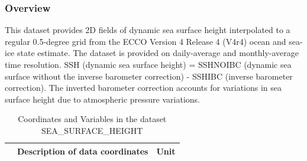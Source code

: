 \subsubsection{Overview}
This dataset provides 2D fields of dynamic sea surface height interpolated to a regular 0.5-degree grid from the ECCO Version 4 Release 4 (V4r4) ocean and sea-ice state estimate. The dataset is provided on daily-average and monthly-average time resolution. SSH (dynamic sea surface height) = SSHNOIBC (dynamic sea surface without the inverse barometer correction) - SSHIBC (inverse barometer correction). The inverted barometer correction accounts for variations in sea surface height due to atmospheric pressure variations. 
\begin{longtable}{|m{}|m{}|m{}|}
\caption{Coordinates and Variables in the dataset SEA\_SURFACE\_HEIGHT}
\label{tab:table-<xarray.Dataset> Size: 3MB
Dimensions:         (time: 1, latitude: 360, longitude: 720, nv: 2)
Coordinates:
  * time            (time) datetime64[ns] 8B 2017-12-29T12:00:00
  * latitude        (latitude) float32 1kB -89.75 -89.25 -88.75 ... 89.25 89.75
  * longitude       (longitude) float32 3kB -179.8 -179.2 -178.8 ... 179.2 179.8
    time_bnds       (time, nv) datetime64[ns] 16B ...
    latitude_bnds   (latitude, nv) float32 3kB ...
    longitude_bnds  (longitude, nv) float32 6kB ...
Dimensions without coordinates: nv
Data variables:
    SSH             (time, latitude, longitude) float32 1MB ...
    SSHIBC          (time, latitude, longitude) float32 1MB ...
    SSHNOIBC        (time, latitude, longitude) float32 1MB ...
Attributes: (12/57)
    acknowledgement:              This research was carried out by the Jet Pr...
    author:                       Ian Fenty and Ou Wang
    cdm_data_type:                Grid
    comment:                      Fields provided on a regular lat-lon grid. ...
    Conventions:                  CF-1.8, ACDD-1.3
    coordinates_comment:          Note: the global 'coordinates' attribute de...
    ...                           ...
    time_coverage_duration:       P1D
    time_coverage_end:            2017-12-30T00:00:00
    time_coverage_resolution:     P1D
    time_coverage_start:          2017-12-29T00:00:00
    title:                        ECCO Sea Surface Height - Daily Mean 0.5 De...
    uuid:                         7beb77e0-404a-11eb-8bf7-0cc47a3f891b-fields} \\ 
\hline \endhead \hline \endfoot
\rowcolor{lightgray} \multicolumn{1}{|c|}{\textbf{Coordinates}} & \multicolumn{1}{|c|}{\textbf{Description of data coordinates}} &  \multicolumn{1}{|c|}{\textbf{Unit}}\\ \hline

\end{longtable}
